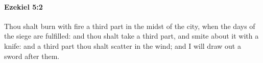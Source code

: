 
		\paragraph{Ezekiel 5:2} %
			\label{EZEKIEL-5-2}

			Thou shalt burn with fire a third part in the midst of the city, when the days of the siege are fulfilled: and thou shalt take a third part, and smite about it with a knife: and a third part thou shalt scatter in the wind; and I will draw out a sword after them.


